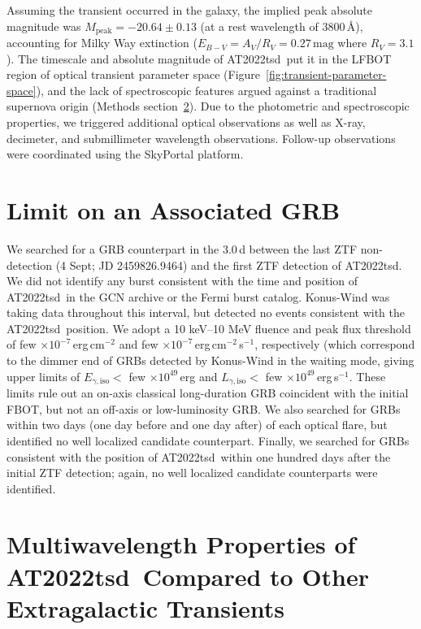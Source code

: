 \documentclass{nature_plusfigure}
\newcommand{\at}{AT2022tsd}
\begin{document}
\begin{methods}
Assuming the transient occurred in the galaxy, the implied peak absolute magnitude was $M_{\mathrm{peak}}=-20.64\pm0.13$ (at a rest wavelength of 3800\,\AA), accounting for Milky Way extinction ($E_{B-V}=A_V/R_V=0.27\,\mathrm{mag}$ where $R_V=3.1$)\cite{Finkbeiner1999,Schlegel1998,Schlafly2011}.
The timescale and absolute magnitude of \at\ put it in the LFBOT region of optical transient parameter space (Figure~\ref{fig:transient-parameter-space}), and the lack of spectroscopic features argued against a traditional supernova origin (Methods section~\ref{sec:multiwavelength-properties}). Due to the photometric and spectroscopic properties, we triggered additional optical observations as well as X-ray, decimeter, and submillimeter wavelength observations. Follow-up observations were coordinated using the SkyPortal\cite{vanderWalt2019,Coughlin2023} platform.

\section{Limit on an Associated GRB}
\label{sec:grbsearch}

We searched for a GRB counterpart in the 3.0\,d between the last ZTF non-detection (4 Sept; JD 2459826.9464) and the first ZTF detection of \at. We did not identify any burst consistent with the time and position of \at\ in the GCN archive or the Fermi burst catalog. Konus-Wind was taking data throughout this interval, but detected no events consistent with the \at\ position. 
We adopt a 10 keV--10 MeV fluence and peak flux threshold of few $\times10^{-7}$\,erg\,cm$^{-2}$ and few $\times10^{-7}$\,erg\,cm$^{-2}$\,s$^{-1}$,
respectively (which correspond to the dimmer end of GRBs detected by Konus-Wind in the waiting mode\cite{Tsvetkova2021},
giving upper limits of $E_{\gamma,\mathrm{iso}} <$ few $\times 10^{49}$\,erg and $L_{\gamma,\mathrm{iso}} <$ few $\times10^{49}$\,erg\,s$^{-1}$. 
These limits rule out an on-axis classical long-duration GRB coincident with the initial FBOT, but not an off-axis or low-luminosity GRB\cite{Cano2017}.
We also searched for GRBs within two days (one day before and one day after) of each optical flare, but identified no well localized candidate counterpart.
Finally, we searched for GRBs consistent with the position of \at\ within one hundred days after the initial ZTF detection; again, no well localized candidate counterparts were identified.

\section{Multiwavelength Properties of \at\ Compared to Other Extragalactic Transients}
\label{sec:multiwavelength-properties}


\end{methods}
\end{document}
